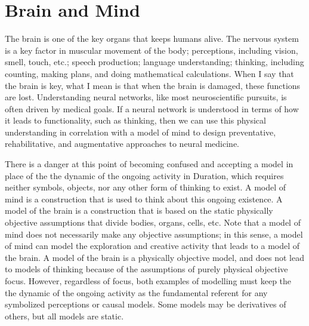 \section{Brain and Mind}

The brain is one of the key organs that keeps humans alive.  The
nervous system is a key factor in muscular movement of the body;
perceptions, including vision, smell, touch, etc.; speech production;
language understanding; thinking, including counting, making plans,
and doing mathematical calculations.  When I say that the brain is
key, what I mean is that when the brain is damaged, these functions
are lost.  Understanding neural networks, like most neuroscientific
pursuits, is often driven by medical goals.  If a neural network is
understood in terms of how it leads to functionality, such as
thinking, then we can use this physical understanding in correlation
with a model of mind to design preventative, rehabilitative, and
augmentative approaches to neural medicine.

There is a danger at this point of becoming confused and accepting a
model in place of the the dynamic of the ongoing activity in Duration,
which requires neither symbols, objects, nor any other form of
thinking to exist.  A model of mind is a construction that is used to
think about this ongoing existence.  A model of the brain is a
construction that is based on the static physically objective
assumptions that divide bodies, organs, cells, etc.  Note that a model
of mind does not necessarily make any objective assumptions; in this
sense, a model of mind can model the exploration and creative activity
that leads to a model of the brain.  A model of the brain is a
physically objective model, and does not lead to models of thinking
because of the assumptions of purely physical objective focus.
However, regardless of focus, both examples of modelling must keep the
the dynamic of the ongoing activity as the fundamental referent for
any symbolized perceptions or causal models.  Some models may be
derivatives of others, but all models are static.

